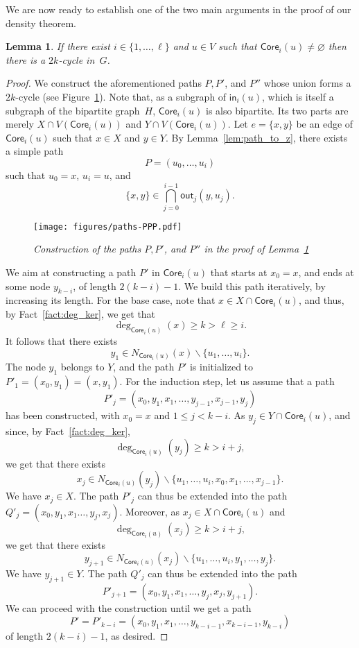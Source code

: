\documentclass{article}
\newcommand{\F}{{\mathsf{out}}}
\renewcommand{\H}{{\mathsf{in}}}
\newcommand{\bp}{X}
\newcommand{\tp}{Y}
\newtheorem{lemma}{Lemma}
\begin{document}
We are now ready to establish one of the two main arguments in the proof of our density theorem. 

\begin{lemma}\label{lem:cycle}
    If there exist $i\in \{1,\dots,\ell\}$ and $u\in V$ such that $\mathsf{Core}_i(u)\neq\varnothing$ then there is a $2k$-cycle in~$G$.
\end{lemma}
\begin{proof}    
We construct the aforementioned paths $P,P'$, and $P''$ whose union forms a $2k$-cycle (see Figure~\ref{fig:paths-PPP}). Note that, as a subgraph of $\H_i(u)$, which is itself a subgraph of the bipartite graph~$H$, $\mathsf{Core}_i(u)$ is also bipartite. Its two parts are merely $\bp\cap V(\mathsf{Core}_i(u))$ and $\tp\cap V(\mathsf{Core}_i(u))$. Let $e=\{x,y\}$ be an edge of $\mathsf{Core}_i(u)$ such that $x\in \bp$ and $y\in \tp$. By Lemma~\ref{lem:path_to_z}, there exists a simple path \[P=(u_0,\dots,u_i)\] such that $u_0=x$, $u_i=u$, and
\[
\{x,y\}\in \bigcap_{j=0}^{i-1} \F_j(y,u_j).
\]

\begin{figure}[htb]
    \centerline{\texttt{[image: figures/paths-PPP.pdf]}}
    \caption{\sl Construction of the paths $P,P'$, and $P''$ in the proof of Lemma~\ref{lem:cycle}}
    \label{fig:paths-PPP}
\end{figure}

We aim at constructing a path $P'$ in $\mathsf{Core}_i(u)$ that starts at $x_0=x$, and ends at some node $y_{k-i}$, of length $2(k-i)-1$. We build this path iteratively, by increasing its length. 
For the base case, note that $x\in \bp\cap\mathsf{Core}_i(u)$, and thus, by Fact~\ref{fact:deg_ker}, we get that \[\deg_{\mathsf{Core}_i(u)}(x)\geq k>\ell\geq i.\] It follows that there exists 
\[y_1\in N_{\mathsf{Core}_i(u)}(x)\smallsetminus\{u_1,\dots,u_i\}.\] 
The node $y_1$ belongs to $\tp$, and the path $P'$ is initialized to $P'_1=(x_0,y_1)=(x,y_1)$.
For the induction step, let us assume that a path 
\[P'_j=(x_0,y_1,x_1,\dots,y_{j-1},x_{j-1},y_j)\] 
has been constructed, with $x_0=x$ and $1\leq j<k-i$. As $y_j\in \tp\cap \mathsf{Core}_i(u)$, and since, by Fact~\ref{fact:deg_ker},
\[
\deg_{\mathsf{Core}_i(u)}(y_j)\geq k>i+j,
\]
we get that there exists 
\[
x_j\in N_{\mathsf{Core}_i(u)}(y_j)\smallsetminus\{u_1,\dots,u_i,x_0,x_1,\dots,x_{j-1}\}.
\]
We have $x_j\in \bp$. The path $P'_j$ can thus be extended into the path $Q'_j=(x_0,y_1,x_1\dots,y_j,x_j)$. Moreover, as $x_j\in \bp\cap\mathsf{Core}_i(u)$ and 
\[\deg_{\mathsf{Core}_i(u)}(x_j)\geq k>i+j,\]
we get that there exists 
\[y_{j+1}\in N_{\mathsf{Core}_i(u)}(x_j)\smallsetminus\{u_1,\dots,u_i,y_1,\dots,y_j\}.\] 
We have $y_{j+1}\in \tp$. The path $Q'_j$ can thus be extended into the path 
\[P'_{j+1}=(x_0,y_1,x_1,\dots,y_j,x_j,y_{j+1}).\]
We can proceed with the construction until we get a path 
\[P'=P'_{k-i}=(x_0,y_1,x_1,\dots,y_{k-i-1},x_{k-i-1},y_{k-i})\]
of length $2(k-i)-1$, as desired.


\end{proof}
\end{document}

